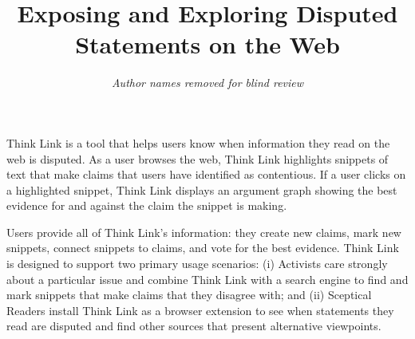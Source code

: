 \documentclass{chi2009}
\begin{document}

\toappear{}



\title{Exposing and Exploring Disputed Statements on the Web}


\author{
\parbox[t]{9cm}{\centering
	     {\em Author names removed for blind review}\\
}
}

\maketitle


\abstract
Think Link is a tool that helps users know when information they read on the web is disputed. 
As a user browses the web, Think Link highlights snippets of text that make claims that users have identified as contentious. 
If a user clicks on a highlighted snippet, Think Link displays an argument graph showing the best evidence for and against the claim the snippet is making.

Users provide all of Think Link's information: they create new claims, mark new snippets, connect snippets to claims, and vote for the best evidence.
Think Link is designed to support two primary usage scenarios: (i) Activists care strongly about a particular issue and combine Think Link with a search engine to find and mark snippets that make claims that they disagree with; and (ii) Sceptical Readers install Think Link as a browser extension to see when statements they read are disputed and find other sources that present alternative viewpoints.

\end{document}
